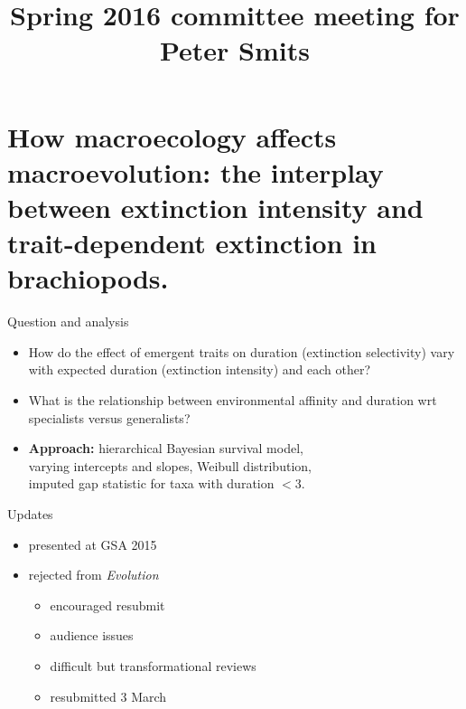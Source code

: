 \documentclass{beamer}
\title{Spring 2016 committee meeting for Peter Smits}
\author{}
\institute{}
\date{}
\begin{document}
\begin{frame}
  \maketitle
\end{frame}

\begin{frame}
  \tableofcontents
\end{frame}


\section{How macroecology affects macroevolution: the interplay between extinction intensity and trait-dependent extinction in brachiopods.}

\begin{frame}
  \begin{alertblock}{Question and analysis}
    \begin{itemize}
      \item How do the effect of emergent traits on duration (\alert{extinction selectivity}) vary with expected duration (\alert{extinction intensity}) and each other?
      \item What is the relationship between environmental affinity and duration wrt specialists versus generalists?
      \item \textbf{Approach:} hierarchical Bayesian survival model, \\varying intercepts and slopes, Weibull distribution, \\imputed gap statistic for taxa with duration \(< 3\).
    \end{itemize}
  \end{alertblock}
\end{frame}

\begin{frame}
  \begin{alertblock}{Updates}
    \begin{itemize}
      \item presented at GSA 2015
      \item rejected from \textit{Evolution}
        \begin{itemize}
          \item encouraged resubmit
          \item audience issues
          \item difficult but transformational reviews
          \item resubmitted 3 March
        \end{itemize}
    \end{itemize}
  \end{alertblock}
\end{frame}
\end{document}
